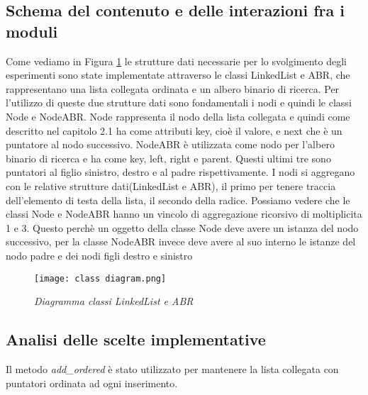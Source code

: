 \documentclass{article}
\begin{document}
\subsection{Schema del contenuto e delle interazioni fra i moduli}
Come vediamo in Figura \ref{classdiag} le strutture dati necessarie per lo svolgimento degli esperimenti sono state implementate attraverso le classi LinkedList e ABR, che rappresentano una lista collegata ordinata e un albero binario di ricerca.
Per l'utilizzo di queste due strutture dati sono fondamentali i nodi e quindi le classi Node e NodeABR. Node rappresenta il nodo della lista collegata e quindi come descritto nel capitolo 2.1 ha come attributi key, cioè il valore, e next che è un puntatore al nodo successivo.
NodeABR è utilizzata come nodo per l'albero binario di ricerca e ha come key, left, right e parent. Questi ultimi tre sono puntatori al figlio sinistro, destro e al padre rispettivamente.
I nodi si aggregano con le relative strutture dati(LinkedList e ABR), il primo per tenere traccia dell'elemento di testa della lista, il secondo della radice.
Possiamo vedere che le classi Node e NodeABR hanno un vincolo di aggregazione ricorsivo di moltiplicita 1 e 3. Questo perchè un oggetto della classe Node deve avere un istanza del nodo successivo, per la classe NodeABR invece deve avere al suo interno le istanze del nodo padre e dei nodi figli destro e sinistro
\begin{figure}[H]
    \texttt{[image: class diagram.png]}
    \caption{\textit{Diagramma classi LinkedList e ABR}}
    \label{classdiag}
\end{figure}
\newpage
\subsection{Analisi delle scelte implementative}
Il metodo \textit{add\_ordered} è stato utilizzato per mantenere la lista collegata con puntatori ordinata ad ogni inserimento.
\end{document}
